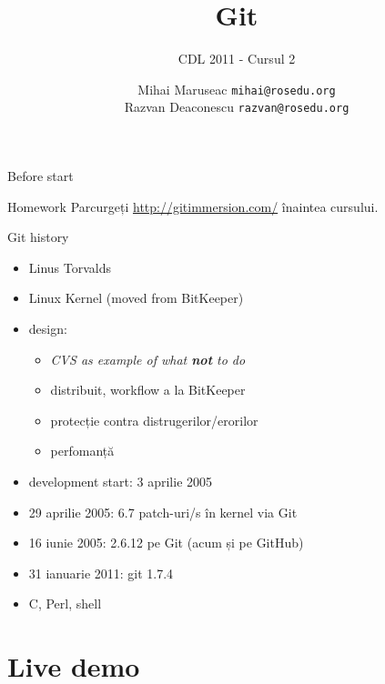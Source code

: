 \documentclass{beamer}
\title[]{Git}
\subtitle{CDL 2011 - Cursul 2}
\institute[]{ROSEdu}
\author[]{
  Mihai Maruseac \texttt{mihai@rosedu.org} \\
  Razvan Deaconescu \texttt{razvan@rosedu.org}
}
\begin{document}
\maketitle

\begin{frame}{Before start}
  \begin{alertblock}{Homework}
    Parcurgeți \url{http://gitimmersion.com/} înaintea cursului.
  \end{alertblock}
\end{frame}

\begin{frame}{Git history}
  \begin{itemize}
    \item Linus Torvalds
    \item Linux Kernel (moved from BitKeeper)
    \item design:
      \begin{itemize}
        \item \textit{CVS as example of what \textbf{not} to do}
        \item distribuit, workflow a la BitKeeper
        \item protecție contra distrugerilor/erorilor
        \item perfomanță
      \end{itemize}
    \item development start: 3 aprilie 2005
    \item 29 aprilie 2005: 6.7 patch-uri/s în kernel via Git
    \item 16 iunie 2005: 2.6.12 pe Git (acum și pe GitHub)
    \item 31 ianuarie 2011: git 1.7.4
    \item C, Perl, shell
  \end{itemize}
\end{frame}

\section{Live demo}
\end{document}

